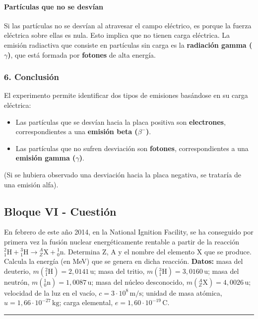 \paragraph{Partículas que no se desvían}
Si las partículas no se desvían al atravesar el campo eléctrico, es porque la fuerza eléctrica sobre ellas es nula. Esto implica que no tienen carga eléctrica. La emisión radiactiva que consiste en partículas sin carga es la \textbf{radiación gamma ($\gamma$)}, que está formada por \textbf{fotones} de alta energía.

\subsubsection*{6. Conclusión}
\begin{cajaconclusion}
El experimento permite identificar dos tipos de emisiones basándose en su carga eléctrica:
\begin{itemize}
    \item Las partículas que se desvían hacia la placa positiva son \textbf{electrones}, correspondientes a una \textbf{emisión beta ($\beta^-$)}.
    \item Las partículas que no sufren desviación son \textbf{fotones}, correspondientes a una \textbf{emisión gamma ($\gamma$)}.
\end{itemize}
(Si se hubiera observado una desviación hacia la placa negativa, se trataría de una emisión alfa).
\end{cajaconclusion}

\newpage
\subsection{Bloque VI - Cuestión}
\label{subsec:A6_2014_jun_ord}

\begin{cajaenunciado}
En febrero de este año 2014, en la National Ignition Facility, se ha conseguido por primera vez la fusión nuclear energéticamente rentable a partir de la reacción ${}_1^2\text{H} + {}_1^3\text{H} \to {}_Z^A\text{X} + {}_0^1\text{n}$. Determina Z, A y el nombre del elemento X que se produce. Calcula la energía (en MeV) que se genera en dicha reacción.
\textbf{Datos:} masa del deuterio, $m({}_1^2\text{H})=2,0141\,\text{u}$; masa del tritio, $m({}_1^3\text{H})=3,0160\,\text{u}$; masa del neutrón, $m({}_0^1\text{n})=1,0087\,\text{u}$; masa del núcleo desconocido, $m({}_Z^A\text{X})=4,0026\,\text{u}$; velocidad de la luz en el vacío, $c=3\cdot10^8\,\text{m/s}$; unidad de masa atómica, $u=1,66\cdot10^{-27}\,\text{kg}$; carga elemental, $e=1,60\cdot10^{-19}\,\text{C}$.
\end{cajaenunciado}
\hrule

